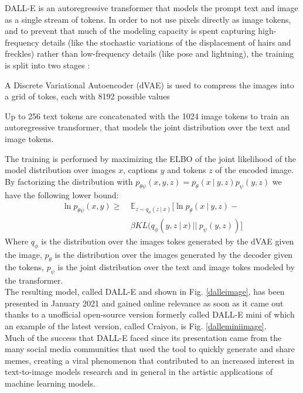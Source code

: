 \documentclass[conference]{IEEEtran}
\begin{document}
DALL-E \cite{dallepaper} is an autoregressive transformer that models the prompt text and image as a single stream of tokens. In order to not use pixels directly as image tokens, and to prevent that much of the modeling capacity is spent capturing high-frequency details (like the stochastic variations of the displacement of hairs and freckles) rather than low-frequency details (like pose and lightning), the training is split into two stages \cite{dallepaper}:
\begin{list}{-}{}
	\item A Discrete Variational Autoencoder (dVAE) is used to compress the images into a grid of tokes, each with 8192 possible values
	\item Up to 256 text tokens are concatenated with the 1024 image tokens to train an autoregressive transformer, that models the joint distribution over the text and image tokens.
\end{list}
The training is performed by maximizing the ELBO of the joint likelihood of the model distribution over images $x$, captions $y$ and tokens $z$ of the encoded image. By factorizing the distribution with $p_{\theta\psi}(x,y,z)=p_\theta(x\:|\:y,z)p_\psi(y,z)$ we have the following lower bound:
\begin{equation}
\begin{aligned}
\ln p_{\theta\psi}(x,y) \geq&\: \mathbb{E}_{z\sim q_\phi(z\:|\:x)}[\ln p_\theta(x\:|\:y,z)-\\
&\:\beta KL(q_\phi(y,z\:|\:x)\:||\:p_\psi(y,z))]
\label{dallelowerbound}
\end{aligned}
\end{equation}
Where $q_\phi$ is the distribution over the images tokes generated by the dVAE given the image, $p_\theta$ is the distribution over the images generated by the decoder given the tokens, $p_\psi$ is the joint distribution over the text and image tokes modeled by the transformer.\\
The resulting model, called DALL-E and shown in Fig. \ref{dalleimage}, has been presented in January 2021 \cite{dalle} and gained online relevance as soon as it came out thanks to a unofficial open-source version formerly called DALL-E mini \cite{dallemini} of which an example of the latest version, called Craiyon, is Fig. \ref{dalleminiimage}.\\
Much of the success that DALL-E faced since its presentation came from the many social media communities that used the tool to quickly generate and share memes, creating a viral phenomenon that contributed to an increased interest in text-to-image models research and in general in the artistic applications of machine learning models.
\end{document}
